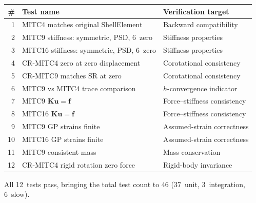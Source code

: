 \begin{center}
\small
\begin{tabular}{r l l}
  \toprule
  \# & Test name & Verification target \\
  \midrule
  1  & MITC4 matches original ShellElement     & Backward compatibility \\
  2  & MITC9 stiffness: symmetric, PSD, 6~zero & Stiffness properties \\
  3  & MITC16 stiffness: symmetric, PSD, 6~zero & Stiffness properties \\
  4  & CR-MITC4 zero at zero displacement       & Corotational consistency \\
  5  & CR-MITC9 matches SR at zero              & Corotational consistency \\
  6  & MITC9 vs MITC4 trace comparison          & $h$-convergence indicator \\
  7  & MITC9 $\mathbf{K}\mathbf{u}=\mathbf{f}$ & Force--stiffness consistency \\
  8  & MITC16 $\mathbf{K}\mathbf{u}=\mathbf{f}$ & Force--stiffness consistency \\
  9  & MITC9 GP strains finite                  & Assumed-strain correctness \\
  10 & MITC16 GP strains finite                 & Assumed-strain correctness \\
  11 & MITC9 consistent mass                    & Mass conservation \\
  12 & CR-MITC4 rigid rotation zero force       & Rigid-body invariance \\
  \bottomrule
\end{tabular}
\end{center}

All 12~tests pass, bringing the total test count to 46 (37~unit,
3~integration, 6~slow).
